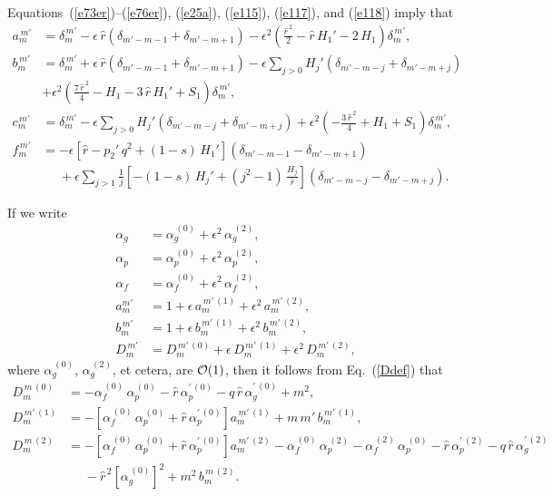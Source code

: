 \documentclass[12pt,prb,aps]{revtex4-1}
\begin{document}
Equations~(\ref{e73er})--(\ref{e76er}), (\ref{e25a}), (\ref{e115}), (\ref{e117}), and (\ref{e118}) imply that
\begin{align}\label{e120}
a_m^{\,m'} &= \delta_{m}^{\,m'} -\epsilon\,\hat{r}\left(\delta_{m'-m-1}+\delta_{m'-m+1}\right)-\epsilon^2\left(\frac{\hat{r}^{\,2}}{2}-\hat{r}\,H_1'-2\,H_1\right)\delta_m^{\,m'},\\[0.5ex]
b_m^{\,m'}&= \delta_m^{\,m'}+\epsilon\,\hat{r}\left(\delta_{m'-m-1}+\delta_{m'-m+1}\right)-\epsilon\sum_{j>0}H_j'\left(\delta_{m'-m-j}+\delta_{m'-m+j}\right)\nonumber\\[0.5ex]
&+ \epsilon^2\left(\frac{7\,\hat{r}^{\,2}}{4} - H_1 -3\,\hat{r}\,H_1' + S_1\right)\delta_{m}^{\,m'},\\[0.5ex]
c_m^{\,m'} &= \delta_m^{\,m'}-\epsilon\sum_{j>0}H_j'\left(\delta_{m'-m-j}+\delta_{m'-m+j}\right)+ \epsilon^2\left(-\frac{3\,\hat{r}^{\,2}}{4} + H_1 + S_1\right)\delta_{m}^{\,m'},\\[0.5ex]
f_m^{\,m'} &= -\epsilon\left[\hat{r} - p_2'\,q^2+ (1-s)\,H_1'\right]\left(\delta_{m'-m-1}-\delta_{m'-m+1}\right) \nonumber\\[0.5ex]
&\phantom{=}+ \epsilon\sum_{j>1}\frac{1}{j}\left[-(1-s)\,H_j'+(j^2-1)\,\frac{H_j}{\hat{r}}\right]\left(\delta_{m'-m-j}-\delta_{m'-m+j}\right).\label{e123}
\end{align}

If we write
\begin{align}
\alpha_g&= \alpha_g^{\,(0)} + \epsilon^2\,\alpha_g^{\,(2)},\\[0.5ex]
\alpha_p&= \alpha_p^{\,(0)} + \epsilon^2\,\alpha_p^{\,(2)},\\[0.5ex]
\alpha_f&= \alpha_f^{\,(0)} + \epsilon^2\,\alpha_f^{\,(2)},\\[0.5ex]
a_{m}^{m'} &= 1 + \epsilon\,a_m^{\,m'\,(1)} + \epsilon^2\,a_{m}^{\,m'\,(2)},\\[0.5ex]
b_{m}^{\,m'} &= 1 + \epsilon\,b_m^{\,m'\,(1)} + \epsilon^2\,b_{m}^{\,m'\,(2)},\\[0.5ex]
D_{m}^{\,m'} &= D_m^{\,m'\,(0)} + \epsilon\,D_m^{\,m'\,(1)} + \epsilon^2\,D_{m}^{\,m'\,(2)},
\end{align}
where $\alpha_g^{\,(0)}$, $\alpha_g^{\,(2)}$, et cetera, are ${\cal O}(1)$, 
then it follows from Eq.~(\ref{Ddef}) that
\begin{align}\label{e130}
D_m^{\,m\,(0)} &= -\alpha_f^{\,(0)}\,\alpha_p^{\,(0)} - \hat{r}\,\alpha_p^{\prime\,(0)} - q\,\hat{r}\,\alpha_g^{\prime\,(0)} + m^2,\\[0.5ex]
D_{m}^{\,m'\,(1)}&=   - \left[\alpha_f^{\,(0)}\,\alpha_p^{\,(0)} + \hat{r}\,\alpha_p^{\prime\,(0)}\right]a_m^{\,m'\,(1)} + m\,m'\,b_m^{\,m'\,(1)},\\[0.5ex]
D_{m}^{\,m\,(2)}&=  -\left[\alpha_f^{\,(0)}\,\alpha_p^{\,(0)} + \hat{r}\,\alpha_p^{\prime\,(0)}\right]a_m^{\,m'\,(2)} 
-\alpha_f^{\,(0)}\,\alpha_p^{\,(2)}-\alpha_f^{\,(2)}\,\alpha_p^{\,(0)}-\hat{r}\,\alpha_p^{\prime\,(2)} - q\,\hat{r}\,\alpha_g^{\prime\,(2)}\nonumber\\[0.5ex]&\phantom{=}
-\hat{r}^{\,2}\left[\alpha_g^{\,(0)}\right]^2+m^2\,b_m^{\,m\,(2)}.\label{e132}
\end{align}
\end{document}
